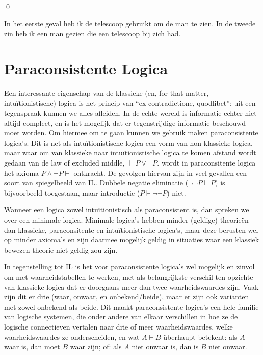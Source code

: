 \begin{example}
\begin{wprooftree}
\end{wprooftree}
\hfill\qed

In het eerste geval heb ik de telescoop gebruikt om de man te zien. In de tweede zin heb ik een man gezien die een telescoop bij zich had.

\end{example}


\section{Paraconsistente Logica}
Een interessante eigenschap van de klassieke (en, for that matter, intu\"itionistische) logica is het princip van \enquote{ex contradictione, quodlibet}: uit een tegenspraak kunnen we alles afleiden. In de echte wereld is informatie echter niet altijd compleet, en is het mogelijk dat er tegenstrijdige informatie beschouwd moet worden. Om hiermee om te gaan kunnen we gebruik maken paraconsistente logica's. Dit is net als intu\"itionistische logica een vorm van non-klassieke logica, maar waar om van klassieke naar intu\"itionistische logica te komen afstand wordt gedaan van de law of excluded middle, $\vdash P \lor \neg P$. wordt in paraconsitente logica het axioma $P \land \neg P \vdash$ ontkracht. De gevolgen hiervan zijn in veel gevallen een soort van spiegelbeeld van IL. Dubbele negatie eliminatie ($\neg \neg P \vdash P$) is bijvoorbeeld toegestaan, maar introductie ($P \vdash \neg \neg P$) niet.

\begin{aside}
Wanneer een logica zowel intu\"itionistisch als paraconsistent is, dan spreken we over een minimale logica. Minimale logica's hebben minder (geldige) theorie\"en dan klassieke, paraconsitente en intu\"itionistische logica's, maar deze berusten wel op minder axioma's en zijn daarmee mogelijk geldig in situaties waar een klassiek bewezen theorie niet geldig zou zijn.
\end{aside}

In tegenstelling tot IL is het voor paraconsistente logica's wel mogelijk en zinvol om met waarheidstabellen te werken, met als belangrijkste verschil ten opzichte van klassieke logica dat er doorgaans meer dan twee waarheidswaardes zijn. Vaak zijn dit er drie (waar, onwaar, en onbekend/beide), maar er zijn ook varianten met zowel onbekend als beide. Dit maakt paraconsistente logica's een hele familie van logische systemen, die onder andere van elkaar verschillen in hoe ze de logische connectieven vertalen naar drie of meer waarheidswaardes, welke waarheidswaardes ze onderscheiden, en wat $A \vdash B$ \"uberhaupt betekent: als $A$ waar is, dan moet $B$ waar zijn; of: als $A$ niet onwaar is, dan is $B$ niet onwaar.

